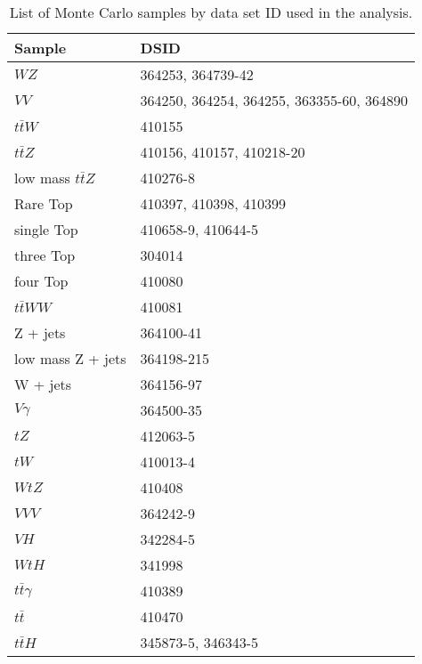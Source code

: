 \begin{table}[H]
    \centering
    \begin{tabular}{l|l}
        \hline\hline
        Sample & DSID \\
        \hline\hline
        $WZ$ & 364253, 364739-42 \\
        $VV$ & 364250, 364254, 364255, 363355-60, 364890 \\
        $t\bar{t}W$ & 410155 \\
        $t\bar{t}Z$ & 410156, 410157, 410218-20 \\
        low mass $t\bar{t}Z$ & 410276-8 \\
        Rare Top & 410397, 410398, 410399 \\
        single Top & 410658-9, 410644-5 \\
        three Top & 304014 \\
        four Top & 410080 \\
        $t\bar{t}WW$ & 410081 \\
        Z + jets & 364100-41 \\
        low mass Z + jets & 364198-215 \\
        W + jets & 364156-97 \\
        $V\gamma$ & 364500-35 \\
        $tZ$  & 412063-5 \\
        $tW$  & 410013-4 \\
        $WtZ$ & 410408 \\
        $VVV$ & 364242-9 \\
        $VH$ & 342284-5 \\
        $WtH$ & 341998 \\
        $t\bar{t}\gamma$ & 410389 \\
        $t\bar{t}$ & 410470 \\
        $t\bar{t}H$ & 345873-5, 346343-5 \\
        \hline\hline
    \end{tabular}
    \caption{List of Monte Carlo samples by data set ID used in the analysis.}
    \label{tbl:dsids}
\end{table}
